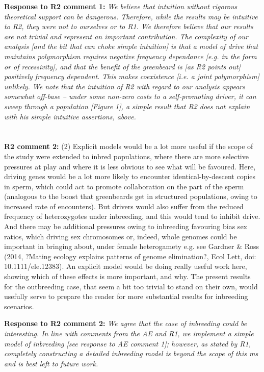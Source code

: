 \documentclass[12pt,letterpaper]{article}
\begin{document}
{\bf{Response to R2 comment 1:}} \emph{We believe that intuition without rigorous theoretical support can be dangerous. Therefore, while the results may be intuitive to R2, they were not to ourselves or to R1. We therefore believe that our results are not trivial and represent an important contribution. The complexity of our analysis [and the bit that can choke simple intuition] is that a model of drive that maintains polymorphism requires negative frequency dependance [e.g. in the form or of recessivity], and that the benefit of the greenbeard is [as R2 points out] positively frequency dependent. This makes coexistence [i.e. a joint polymorphism] unlikely. We note that the intuition of R2 with regard to our analysis appears somewhat off-base -- under some non-zero costs to a self-promoting driver, it can sweep through a population [Figure 1], a simple result that R2 does not explain with his simple intuitive assertions, above.}
\\
\\
\\
{\bf{R2 comment 2:}} (2) Explicit models would be a lot more useful if the scope of the study were extended to inbred populations, where there are more selective pressures at play and where it is less obvious to see what will be favoured. Here, driving genes would be a lot more likely to encounter identical-by-descent copies in sperm, which could act to promote collaboration on the part of the sperm (analogous to the boost that greenbeards get in structured populations, owing to increased rate of encounters). But drivers would also suffer from the reduced frequency of heterozygotes under inbreeding, and this would tend to inhibit drive. And there may be additional pressures owing to inbreeding favouring bias sex ratios, which driving sex chromosomes or, indeed, whole genomes could be important in bringing about, under female heterogamety e.g. see Gardner \& Ross (2014, ?Mating ecology explains patterns of genome elimination?, Ecol Lett, doi: 10.1111/ele.12383). An explicit model would be doing really useful work here, showing which of these effects is more important, and why. The present results for the outbreeding case, that seem a bit too trivial to stand on their own, would usefully serve to prepare the reader for more substantial results for inbreeding scenarios.

{\bf{Response to R2 comment 2:}} \emph{We agree that the case of inbreeding could be interesting. In line with comments from the AE and R1, we implement a simple model of inbreeding [see response to AE comment 1]; however, as stated by R1, completely constructing a detailed inbreeding model is beyond the scope of this ms and is best left to future work. }
\end{document}
